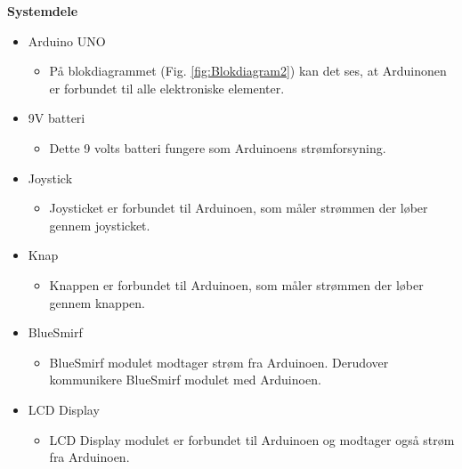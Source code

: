 \newpage
\textbf{Systemdele}
\begin{itemize}
	\item Arduino UNO
\begin{itemize}
\item På blokdiagrammet (Fig. \ref{fig:Blokdiagram2}) kan det ses, at Arduinonen er forbundet til alle elektroniske elementer. 
\end{itemize}

	\item 9V batteri
\begin{itemize}
\item Dette 9 volts batteri fungere som Arduinoens strømforsyning.
\end{itemize}

	\item Joystick
\begin{itemize}
\item Joysticket er forbundet til Arduinoen, som måler strømmen der løber gennem joysticket.
\end{itemize}

	\item Knap
\begin{itemize}
\item Knappen er forbundet til Arduinoen, som måler strømmen der løber gennem knappen.
\end{itemize}

	\item BlueSmirf
\begin{itemize}
\item BlueSmirf modulet modtager strøm fra Arduinoen. Derudover kommunikere BlueSmirf modulet med Arduinoen.
\end{itemize}

	\item LCD Display
\begin{itemize}
\item LCD Display modulet er forbundet til Arduinoen og modtager også strøm fra Arduinoen. 
\end{itemize}

\end{itemize}








